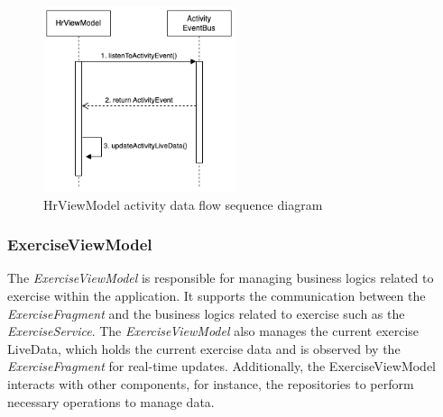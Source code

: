 \begin{figure}[H]
    \centering
    \includegraphics[width=0.5\textwidth]{diagrams/hrviewmodel-activity.drawio.png}
    \caption{HrViewModel activity data flow sequence diagram}
    \label{fig:hrviewmodel_activitydata}
\end{figure}

\subsubsection{ExerciseViewModel}
The \emph{ExerciseViewModel} is responsible for managing business logics related to exercise within the application.
It supports the communication between the \emph{ExerciseFragment} and the business logics related to exercise such as the \emph{ExerciseService}.
The \emph{ExerciseViewModel} also manages the current exercise LiveData, which holds the current exercise data and is observed by the \emph{ExerciseFragment} for real-time updates. 
Additionally, the ExerciseViewModel interacts with other components, for instance, the repositories to perform necessary operations to manage data.

